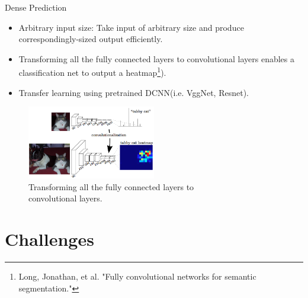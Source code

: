 \documentclass{beamer}
\begin{document}
\begin{frame}{Dense Prediction}
\begin{itemize}
	\item {\color{blue}Arbitrary input size: } Take input of arbitrary size and produce {\color{green}correspondingly-sized} output efficiently.
	\item<2->{Transforming all the {\color{red}fully connected layers} to {\color{green}convolutional layers} enables a classification net to output a heatmap\footnote{Long, Jonathan, et al. "Fully convolutional networks for semantic segmentation."}).}	
	\item<3-> Transfer learning using pretrained DCNN(i.e. VggNet, Resnet).
	\end{itemize}
	\vspace{-0.1cm}
	\begin{figure}
		\centering
		\includegraphics[width=0.5\textwidth]{figure/ss40.png}
		\captionsetup{justification=centering}
		\caption{Transforming all the fully connected layers to \\convolutional layers.}	
	\end{figure}
\end{frame}

\section{Challenges}
\end{document}
